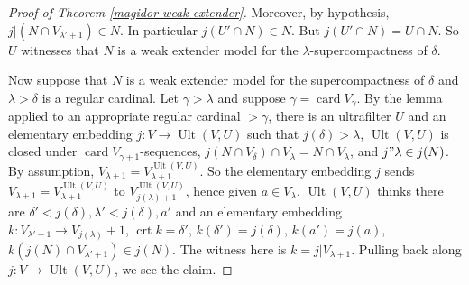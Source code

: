\documentclass[12pt]{report}
\newcommand{\card}{\operatorname{card}}
\DeclareMathOperator{\crt}{crt}
\DeclareMathOperator{\Ult}{Ult}
\theoremstyle{definition}
\begin{document}
\begin{proof}[Proof of Theorem \ref{magidor weak extender}]
Moreover, by hypothesis, $j|(N \cap V_{\lambda' + 1}) \in N$. In particular $j(U' \cap N) \in N$. But $j(U' \cap N) = U \cap N$.
So $U$ witnesses that $N$ is a weak extender model for the $\lambda$-supercompactness of $\delta$.

Now suppose that $N$ is a weak extender model for the supercompactness of $\delta$ and $\lambda > \delta$ is a regular cardinal.
Let $\gamma > \lambda$ and suppose $\gamma = \card V_\gamma$.
By the lemma applied to an appropriate regular cardinal $>\gamma$, there is an ultrafilter $U$ and an elementary embedding $j: V \to \Ult(V, U)$ such that $j(\delta) > \lambda$, $\Ult(V, U)$ is closed under $\card V_{\gamma+1}$-sequences, $j(N \cap V_\delta) \cap V_\lambda = N \cap V_\lambda$, and $j"\lambda \in j(N)$.
By assumption, $V_{\lambda+1} = V_{\lambda+1}^{\Ult(V,U)}$. So the elementary embedding $j$ sends $V_{\lambda+1} = V_{\lambda+1}^{\Ult(V,U)}$ to $V_{j(\lambda)+1}^{\Ult(V,U)}$, hence given $a \in V_\lambda$,
$\Ult(V, U)$ thinks there are $\delta' < j(\delta), \lambda' < j(\delta),a'$ and an elementary embedding $k: V_{\lambda'+1} \to V_{j(\lambda)}+1$, $\crt k = \delta'$, $k(\delta') = j(\delta)$, $k(a') = j(a)$, $k(j(N) \cap V_{\lambda' + 1}) \in j(N)$.
The witness here is $k = j|V_{\lambda+1}$. Pulling back along $j: V \to \Ult(V, U)$, we see the claim.
\end{proof}
\end{document}
